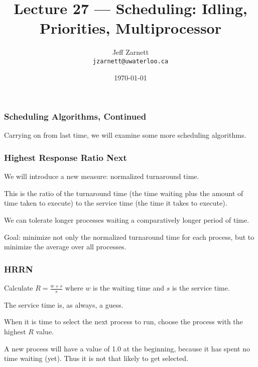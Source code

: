 

\title{Lecture 27 --- Scheduling: Idling, Priorities, Multiprocessor }

\author{Jeff Zarnett \\ \small \texttt{jzarnett@uwaterloo.ca}}
\date{\today}




\begin{frame}
  \titlepage

 \end{frame}



\begin{frame}
\frametitle{Scheduling Algorithms, Continued}

Carrying on from last time, we will examine some more scheduling algorithms.

\end{frame}

\begin{frame}
\frametitle{Highest Response Ratio Next}

We will introduce a new measure: \alert{normalized turnaround time}. 

This is the ratio of the turnaround time (the time waiting plus the amount of time taken to execute) to the service time (the time it takes to execute). 

We can tolerate longer processes waiting a comparatively longer period of time. 

Goal: minimize not only the normalized turnaround time for each process, but to minimize the average over all processes.


\end{frame}

\begin{frame}
\frametitle{HRRN}

Calculate $R = \frac{w + s}{s}$ 
where $w$ is the waiting time and $s$ is the service time. 

The service time is, as always, a guess. 

When it is time to select the next process to run, choose the process with the highest $R$ value. 

A new process will have a value of 1.0 at the beginning, because it has spent no time waiting (yet). Thus it is not that likely to get selected.


\end{frame}


